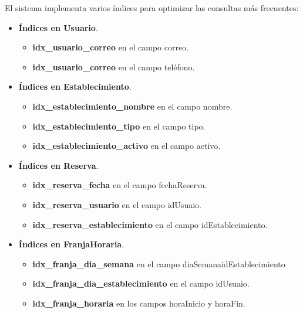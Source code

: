 El sistema implementa varios índices para optimizar las consultas más frecuentes:

\begin{itemize}
	\item \textbf{Índices en Usuario}.
	\begin{itemize}
       \item \textbf{idx\_usuario\_correo} en el campo correo.
       \item \textbf{idx\_usuario\_correo} en el campo teléfono.
	\end{itemize}
\end{itemize}

\begin{itemize}
	\item \textbf{Índices en Establecimiento}.
	\begin{itemize}
       \item \textbf{idx\_establecimiento\_nombre} en el campo nombre.
       \item \textbf{idx\_establecimiento\_tipo} en el campo tipo.
       \item \textbf{idx\_establecimiento\_activo} en el campo activo.
	\end{itemize}
\end{itemize}

\begin{itemize}
	\item \textbf{Índices en Reserva}.
	\begin{itemize}
       \item \textbf{idx\_reserva\_fecha} en el campo fechaReserva.
       \item \textbf{idx\_reserva\_usuario} en el campo idUsuaio.
       \item \textbf{idx\_reserva\_establecimiento} en el campo idEstablecimiento.
	\end{itemize}
\end{itemize}

\begin{itemize}
	\item \textbf{Índices en FranjaHoraria}.
	\begin{itemize}
       \item \textbf{idx\_franja\_dia\_semana} en el campo diaSemanaidEstablecimiento
       \item \textbf{idx\_franja\_dia\_establecimiento} en el campo idUsuaio.
       \item \textbf{idx\_franja\_horaria} en los campos horaInicio y horaFin.
	\end{itemize}
\end{itemize}

